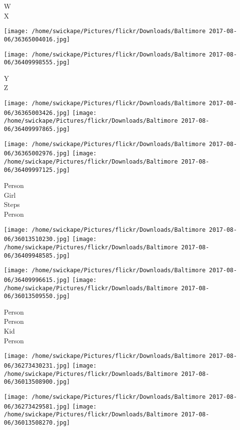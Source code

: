 \documentclass[10pt,letterpaper]{article}
\begin{document}
W\\
X\\
\pagebreak

\texttt{[image: /home/swickape/Pictures/flickr/Downloads/Baltimore 2017-08-06/36365004016.jpg]}

\vspace{0.25in}
\texttt{[image: /home/swickape/Pictures/flickr/Downloads/Baltimore 2017-08-06/36409998555.jpg]}

Y\\
Z\\
\pagebreak

\texttt{[image: /home/swickape/Pictures/flickr/Downloads/Baltimore 2017-08-06/36365003426.jpg]}
\texttt{[image: /home/swickape/Pictures/flickr/Downloads/Baltimore 2017-08-06/36409997865.jpg]}

\texttt{[image: /home/swickape/Pictures/flickr/Downloads/Baltimore 2017-08-06/36365002976.jpg]}
\texttt{[image: /home/swickape/Pictures/flickr/Downloads/Baltimore 2017-08-06/36409997125.jpg]}

Person\\
Girl\\
Steps\\
Person\\
\pagebreak

\texttt{[image: /home/swickape/Pictures/flickr/Downloads/Baltimore 2017-08-06/36013510230.jpg]}
\texttt{[image: /home/swickape/Pictures/flickr/Downloads/Baltimore 2017-08-06/36409948585.jpg]}

\texttt{[image: /home/swickape/Pictures/flickr/Downloads/Baltimore 2017-08-06/36409996615.jpg]}
\texttt{[image: /home/swickape/Pictures/flickr/Downloads/Baltimore 2017-08-06/36013509550.jpg]}

Person\\
Person\\
Kid\\
Person\\
\pagebreak

\texttt{[image: /home/swickape/Pictures/flickr/Downloads/Baltimore 2017-08-06/36273430231.jpg]}
\texttt{[image: /home/swickape/Pictures/flickr/Downloads/Baltimore 2017-08-06/36013508900.jpg]}

\texttt{[image: /home/swickape/Pictures/flickr/Downloads/Baltimore 2017-08-06/36273429581.jpg]}
\texttt{[image: /home/swickape/Pictures/flickr/Downloads/Baltimore 2017-08-06/36013508270.jpg]}
\end{document}
